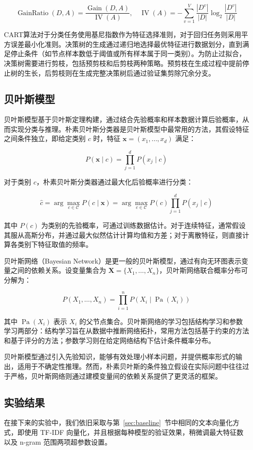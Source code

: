 \documentclass[12pt, a4paper, UTF8]{ctexart}
\begin{document}
\[
\operatorname{GainRatio}(D, A) = \frac{\operatorname{Gain}(D, A)}{\operatorname{IV}(A)}, \quad \operatorname{IV}(A) = -\sum_{v=1}^V \frac{|D^v|}{|D|} \log_2 \frac{|D^v|}{|D|}
\]

CART算法对于分类任务使用基尼指数作为特征选择准则，对于回归任务则采用平方误差最小化准则。决策树的生成通过递归地选择最优特征进行数据划分，直到满足停止条件（如节点样本数低于阈值或所有样本属于同一类别）。为防止过拟合，决策树需要进行剪枝，包括预剪枝和后剪枝两种策略。预剪枝在生成过程中提前停止树的生长，后剪枝则在生成完整决策树后通过验证集剪除冗余分支。



\subsection{贝叶斯模型}\label{sec:enhancement-bayes}
贝叶斯模型基于贝叶斯定理构建，通过结合先验概率和样本数据计算后验概率，从而实现分类与推理。朴素贝叶斯分类器是贝叶斯模型中最常用的方法，其假设特征之间条件独立，即给定类别 $c$ 时，特征 $\mathbf{x} = (x_1, \dots, x_d)$ 满足：

\[
P(\mathbf{x} \mid c) = \prod_{j=1}^d P(x_j \mid c)
\]

对于类别 $c$，朴素贝叶斯分类器通过最大化后验概率进行分类：

\[
\hat{c} = \arg\max_{c \in \mathcal{C}} P(c \mid \mathbf{x}) = \arg\max_{c \in \mathcal{C}} P(c) \prod_{j=1}^d P(x_j \mid c)
\]

其中 $P(c)$ 为类别的先验概率，可通过训练数据估计。对于连续特征，通常假设其服从高斯分布，并通过最大似然估计计算均值和方差；对于离散特征，则直接计算各类别下特征取值的频率。

贝叶斯网络（Bayesian Network）是更一般的贝叶斯模型，通过有向无环图表示变量之间的依赖关系。设变量集合为 $\mathbf{X} = \{X_1, \dots, X_n\}$，贝叶斯网络联合概率分布可分解为：

\[
P(X_1, \dots, X_n) = \prod_{i=1}^n P(X_i \mid \operatorname{Pa}(X_i))
\]

其中 $\operatorname{Pa}(X_i)$ 表示 $X_i$ 的父节点集合。贝叶斯网络的学习包括结构学习和参数学习两部分：结构学习旨在从数据中推断网络拓扑，常用方法包括基于约束的方法和基于评分的方法；参数学习则在给定网络结构下估计条件概率分布。

贝叶斯模型通过引入先验知识，能够有效处理小样本问题，并提供概率形式的输出，适用于不确定性推理。然而，朴素贝叶斯的条件独立假设在实际问题中往往过于严格，贝叶斯网络则通过建模变量间的依赖关系提供了更灵活的框架。



\subsection{实验结果}
在接下来的实验中，我们依旧采取与第~\ref{sec:baseline}~节中相同的文本向量化方式，即使用 TF-IDF 向量化，并且根据每种模型的验证效果，稍微调最大特征数以及 n-gram 范围两项超参数设置。
\end{document}
